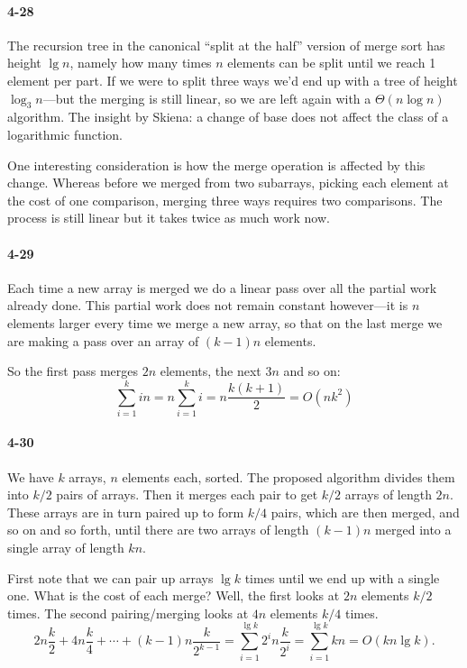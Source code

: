 \documentclass{report}
\begin{document}
\paragraph{4-28} The recursion tree in the canonical ``split at the half'' version of merge sort has height $\lg n$, namely how many times $n$ elements can be split until we reach 1 element per part. If we were to split three ways we'd end up with a tree of height $\log_3 n$---but the merging is still linear, so we are left again with a $\Theta(n\log n)$ algorithm. The insight by Skiena: a change of base does not affect the class of a logarithmic function.

One interesting consideration is how the merge operation is affected by this change. Whereas before we merged from two subarrays, picking each element at the cost of one comparison, merging three ways requires two comparisons. The process is still linear but it takes twice as much work now.

\paragraph{4-29} Each time a new array is merged we do a linear pass over all the partial work already done. This partial work does not remain constant however---it is $n$ elements larger every time we merge a new array, so that on the last merge we are making a pass over an array of $(k-1)n$ elements.

So the first pass merges $2n$ elements, the next $3n$ and so on:
\begin{equation*}\sum_{i=1}^k in = n\sum_{i=1}^k i = n\frac{k(k+1)}{2} = O(nk^2)\end{equation*}

\paragraph{4-30} We have $k$ arrays, $n$ elements each, sorted. The proposed algorithm divides them into $k/2$ pairs of arrays. Then it merges each pair to get $k/2$ arrays of length $2n$. These arrays are in turn paired up to form $k/4$ pairs, which are then merged, and so on and so forth, until there are two arrays of length $(k-1)n$ merged into a single array of length $kn$.

First note that we can pair up arrays $\lg k$ times until we end up with a single one. What is the cost of each merge? Well, the first looks at $2n$ elements $k/2$ times. The second pairing/merging looks at $4n$ elements $k/4$ times.
\[
	2n \frac{k}{2} + 4n \frac{k}{4} + \cdots + (k-1)n \frac{k}{2^{k-1}} 
	= \sum_{i=1}^{\lg k} 2^i n \frac{k}{2^i}
	= \sum_{i=1}^{\lg k} kn = O(kn\lg k).
\]
\end{document}

